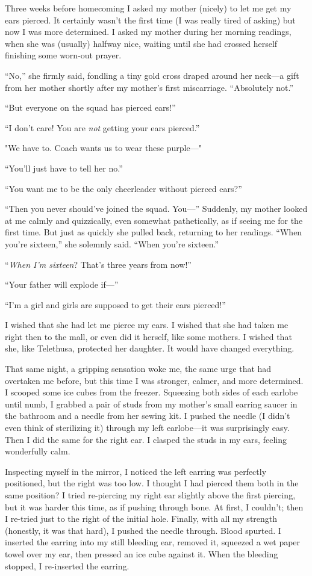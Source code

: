Three weeks before homecoming I asked my mother (nicely) to let me get
my ears pierced. It certainly wasn't the first time (I was really tired
of asking) but now I was more determined. I asked my mother during her
morning readings, when she was (usually) halfway nice, waiting until she
had crossed herself finishing some worn-out prayer.

``No,'' she firmly said, fondling a tiny gold cross draped around her
neck---a gift from her mother shortly after my mother's first
miscarriage. ``Absolutely not.''

``But everyone on the squad has pierced ears!''

``I don't care! You are \emph{not} getting your ears pierced.''

"We have to. Coach wants us to wear these purple---"

``You'll just have to tell her no.''

``You want me to be the only cheerleader without pierced ears?''

``Then you never should've joined the squad. You---'' Suddenly, my
mother looked at me calmly and quizzically, even somewhat pathetically,
as if seeing me for the first time. But just as quickly she pulled back,
returning to her readings. ``When you're sixteen,'' she solemnly said.
``When you're sixteen.''

``\emph{When I'm sixteen}? That's three years from now!''

``Your father will explode if---''

``I'm a girl and girls are supposed to get their ears pierced!''

I wished that she had let me pierce my ears. I wished that she had taken
me right then to the mall, or even did it herself, like some mothers. I
wished that she, like Telethusa, protected her daughter. It would have
changed everything.

That same night, a gripping sensation woke me, the same urge that had
overtaken me before, but this time I was stronger, calmer, and more
determined. I scooped some ice cubes from the freezer. Squeezing both
sides of each earlobe until numb, I grabbed a pair of studs from my
mother's small earring saucer in the bathroom and a needle from her
sewing kit. I pushed the needle (I didn't even think of sterilizing it)
through my left earlobe---it was surprisingly easy. Then I did the same
for the right ear. I clasped the studs in my ears, feeling wonderfully
calm.

Inspecting myself in the mirror, I noticed the left earring was
perfectly positioned, but the right was too low. I thought I had pierced
them both in the same position? I tried re-piercing my right ear
slightly above the first piercing, but it was harder this time, as if
pushing through bone. At first, I couldn't; then I re-tried just to the
right of the initial hole. Finally, with all my strength (honestly, it
was that hard), I pushed the needle through. Blood spurted. I inserted
the earring into my still bleeding ear, removed it, squeezed a wet paper
towel over my ear, then pressed an ice cube against it. When the
bleeding stopped, I re-inserted the earring.


